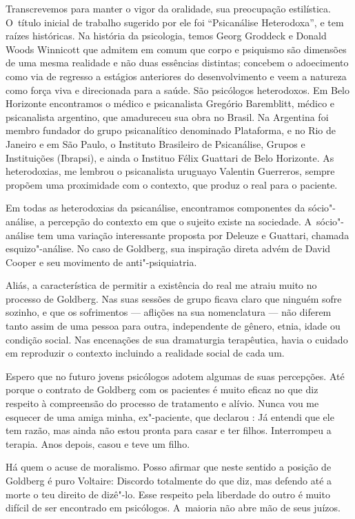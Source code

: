 Transcrevemos para manter o vigor da oralidade, sua preocupação
estilística. O~título inicial de trabalho sugerido por ele foi
``Psicanálise Heterodoxa'', e tem raízes históricas. Na história da
psicologia, temos Georg Groddeck e Donald Woods Winnicott que admitem em
comum que corpo e psiquismo são dimensões de uma mesma realidade e não
duas essências distintas; concebem o adoecimento como via de regresso a
estágios anteriores do desenvolvimento e veem a natureza como força viva
e direcionada para a saúde. São psicólogos heterodoxos. Em Belo
Horizonte encontramos o médico e psicanalista Gregório Baremblitt,
médico e psicanalista argentino, que amadureceu sua obra no Brasil. Na
Argentina foi membro fundador do grupo psicanalítico denominado
Plataforma, e no Rio de Janeiro e em São Paulo, o Instituto Brasileiro
de Psicanálise, Grupos e Instituições (Ibrapsi), e ainda o Instituo
Félix Guattari de Belo Horizonte. As heterodoxias, me lembrou o
psicanalista uruguayo Valentin Guerreros, sempre propõem uma proximidade
com o contexto, que produz o real para o paciente.

Em todas as heterodoxias da psicanálise, encontramos componentes da
sócio"-análise, a percepção do contexto em que o sujeito existe na
sociedade. A~sócio"-análise tem uma variação interessante proposta por
Deleuze e Guattari, chamada esquizo"-análise. No caso de Goldberg, sua
inspiração direta advém de David Cooper e seu movimento de
anti"-psiquiatria.

Aliás, a característica de permitir a existência do real me atraiu muito
no processo de Goldberg. Nas suas sessões de grupo ficava claro que
ninguém sofre sozinho, e que os sofrimentos --- aflições na sua
nomenclatura --- não diferem tanto assim de uma pessoa para outra,
independente de gênero, etnia, idade ou condição social. Nas encenações
de sua dramaturgia terapêutica, havia o cuidado em reproduzir o contexto
incluindo a realidade social de cada um.

Espero que no futuro jovens psicólogos adotem algumas de suas
percepções. Até porque o contrato de Goldberg com os pacientes é muito
eficaz no que diz respeito à compreensão do processo de tratamento e
alívio. Nunca vou me esquecer de uma amiga minha, ex"-paciente, que
declarou : Já entendi que ele tem razão, mas ainda não estou pronta para
casar e ter filhos. Interrompeu a terapia. Anos depois, casou e teve um
filho.

Há quem o acuse de moralismo. Posso afirmar que neste sentido a posição
de Goldberg é puro Voltaire: Discordo totalmente do que diz, mas defendo
até a morte o teu direito de dizê"-lo. Esse respeito pela liberdade do
outro é muito difícil de ser encontrado em psicólogos. A~maioria não
abre mão de seus juízos.

